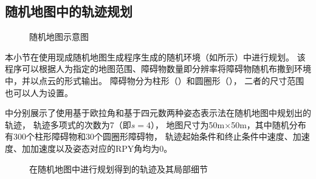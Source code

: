 \subsection{随机地图中的轨迹规划}\label{subsec:planning_in_random_map}
\begin{figure}[!ht]
    \setlength{\subfigcapskip}{-1bp}
    \centering
    \begin{minipage}{\textwidth}
  
    \centering
    \subfigure{\label{fig:random_map_overview}}\addtocounter{subfigure}{-2}
    \hspace{0.2em}
    \subfigure{\label{fig:cylinder_obstacles}}\addtocounter{subfigure}{-2}
    \hspace{0.2em}
    \subfigure{\label{fig:circle_obstacles}}\addtocounter{subfigure}{-2}
    
    \end{minipage}
    \caption{随机地图示意图}
    \label{fig:random_map}
  \end{figure}
本小节在使用现成随机地图生成程序生成的随机环境（如所示）中进行规划。
该程序可以根据人为指定的地图范围、障碍物数量即分辨率将障碍物随机布撒到环境中，并以点云的形式输出。
障碍物分为柱形（）和圆圈形（），
二者的尺寸范围也可以人为设置。

中分别展示了使用基于欧拉角和基于四元数两种姿态表示法在随机地图中规划出的轨迹，
轨迹多项式的次数为7（即$s=4$），
地图尺寸为50m$\times$50m，其中随机分布有300个柱形障碍物和30个圆圈形障碍物，
轨迹起始条件和终止条件中速度、加速度、加加速度以及姿态对应的RPY角均为0。

\begin{figure}[!ht]
    \setlength{\subfigcapskip}{-1bp}
    \centering
    \begin{minipage}{\textwidth}
  
    \centering
    \subfigure{\label{fig:random_map_planning_rpy}}\addtocounter{subfigure}{-2}
    
    \subfigure{\label{fig:random_map_planning_quat}}\addtocounter{subfigure}{-2}
    
    \end{minipage}
    \caption{在随机地图中进行规划得到的轨迹及其局部细节}
    \label{fig:random_map_planning}
\end{figure}

